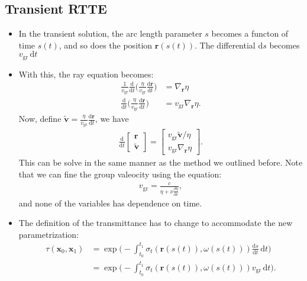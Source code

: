 \documentclass[10pt]{article}
\newcommand{\dee}{\mathrm{d}}
\newcommand{\ve}[1]{\mathbf{#1}}
\newcommand{\group}{\mathrm{gr}}
\begin{document}
  \subsection{Transient RTTE}
  \begin{itemize}
    \item In the transient solution, the arc length parameter $s$ becomes a functon of time $s(t)$, and so does the position $\ve{r}(s(t))$. The differential $\dee s$ becomes $v_\group\, \dee t$

    \item With this, the ray equation becomes:
    \begin{align*}
      \frac{1}{v_\group} \frac{\dee }{\dee t} \bigg( \frac{\eta}{v_\group} \frac{\dee \ve{r}}{\dee t} \bigg)
      &= \nabla_\ve{r} \eta\\
      \frac{\dee }{\dee t} \bigg( \frac{\eta}{v_\group} \frac{\dee \ve{r}}{\dee t} \bigg)
      &= v_\group \nabla_\ve{r} \eta.
    \end{align*}
    Now, define $\tilde{\ve{v}} = \frac{\eta}{v_\group} \frac{\dee \ve{r}}{\dee t}$, we have
    \begin{align*}
      \frac{\dee}{\dee t} \begin{bmatrix}
        \ve{r} \\ \tilde{\ve{v}}
      \end{bmatrix}
      = \begin{bmatrix}
        v_\group \tilde{\ve{v}} / \eta\\
        v_\group \nabla_{\ve{r}} \eta
      \end{bmatrix}.
    \end{align*}
    This can be solve in the same manner as the method we outlined before. Note that we can fine the group valeocity using the equation:
    \begin{align*}
      v_\group = \frac{c}{\eta + \nu \frac{\partial \eta}{\partial \nu}},
    \end{align*}
    and none of the variables has dependence on time.

    \item The definition of the transmittance has to change to accommodate the new parametrization:
    \begin{align*}
      \tau(\ve{x}_0, \ve{x}_1) 
      &= \exp\bigg( - \int_{t_0}^{t_1} \sigma_t(\ve{r}(s(t)), \omega(s(t))) \frac{\dee s}{\dee t}\, \dee t \bigg)\\
      &= \exp\bigg( - \int_{t_0}^{t_1} \sigma_t(\ve{r}(s(t)), \omega(s(t)))v_\group\, \dee t \bigg).
    \end{align*}


\end{itemize}
\end{document}
